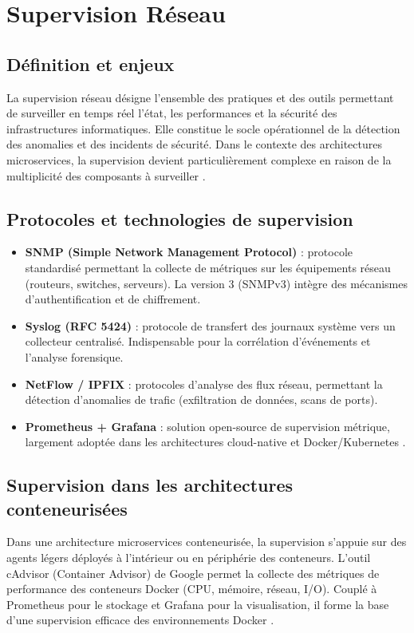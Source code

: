 \section{Supervision Réseau}

\subsection{Définition et enjeux}
La supervision réseau désigne l'ensemble des pratiques et des outils permettant de surveiller en temps réel l'état, les performances et la sécurité des infrastructures informatiques. Elle constitue le socle opérationnel de la détection des anomalies et des incidents de sécurité. Dans le contexte des architectures microservices, la supervision devient particulièrement complexe en raison de la multiplicité des composants à surveiller \cite{microservices}.

\subsection{Protocoles et technologies de supervision}
\begin{itemize}
    \item \textbf{SNMP (Simple Network Management Protocol)} : protocole standardisé permettant la collecte de métriques sur les équipements réseau (routeurs, switches, serveurs). La version 3 (SNMPv3) intègre des mécanismes d'authentification et de chiffrement.
    \item \textbf{Syslog (RFC 5424)} : protocole de transfert des journaux système vers un collecteur centralisé. Indispensable pour la corrélation d'événements et l'analyse forensique.
    \item \textbf{NetFlow / IPFIX} : protocoles d'analyse des flux réseau, permettant la détection d'anomalies de trafic (exfiltration de données, scans de ports).
    \item \textbf{Prometheus + Grafana} : solution open-source de supervision métrique, largement adoptée dans les architectures cloud-native et Docker/Kubernetes \cite{docker}.
\end{itemize}

\subsection{Supervision dans les architectures conteneurisées}
Dans une architecture microservices conteneurisée, la supervision s'appuie sur des agents légers déployés à l'intérieur ou en périphérie des conteneurs. L'outil cAdvisor (Container Advisor) de Google permet la collecte des métriques de performance des conteneurs Docker (CPU, mémoire, réseau, I/O). Couplé à Prometheus pour le stockage et Grafana pour la visualisation, il forme la base d'une supervision efficace des environnements Docker \cite{microservices}.

